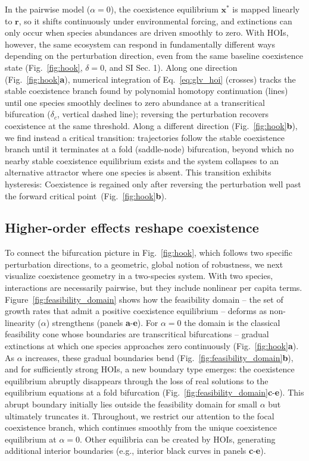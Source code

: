 \documentclass[
 reprint,
 amsmath,
 amssymb,
 aps,
 superscriptaddress,
]{revtex4-2}
\begin{document}
In the pairwise model (\(\alpha=0\)), the coexistence equilibrium \(\mathbf{x}^*\) is mapped linearly to \(\mathbf{r}\), so it shifts continuously under environmental forcing, and extinctions can only occur when species abundances are driven smoothly to zero. With HOIs, however, the same ecosystem can respond in fundamentally different ways depending on the perturbation direction, even from the same baseline coexistence state (Fig.~\ref{fig:hook}, $\delta=0$, and SI Sec. 1). Along one direction (Fig.~\ref{fig:hook}\textbf{a}), numerical integration of Eq.~\eqref{eq:glv_hoi} (crosses) tracks the stable coexistence branch found by polynomial homotopy continuation (lines) until one species smoothly declines to zero abundance at a transcritical bifurcation ($\delta_c$, vertical dashed line); reversing the perturbation recovers coexistence at the same threshold. Along a different direction (Fig.~\ref{fig:hook}\textbf{b}), we find instead a critical transition: trajectories follow the stable coexistence branch until it terminates at a fold (saddle-node) bifurcation, beyond which no nearby stable coexistence equilibrium exists and the system collapses to an alternative attractor where one species is absent. This transition exhibits hysteresis: Coexistence is regained only after reversing the perturbation well past the forward critical point~(Fig.~\ref{fig:hook}\textbf{b}).

\subsection*{Higher-order effects reshape coexistence}

To connect the bifurcation picture in Fig.~\ref{fig:hook}, which follows two specific perturbation directions, to a geometric, global notion of robustness, we next visualize coexistence geometry in a two-species system. With two species, interactions are necessarily pairwise, but they include nonlinear per capita terms. Figure~\ref{fig:feasibility_domain} shows how the feasibility domain -- the set of growth rates that admit a positive coexistence equilibrium -- deforms as non-linearity ($\alpha$) strengthens (panels \textbf{a}-\textbf{e}). For $\alpha=0$ the domain is the classical feasibility cone \cite{saavedra_structural_2017, song_guideline_2018, rohr_structural_2014} whose boundaries are transcritical bifurcations -- gradual extinctions at which one species approaches zero continuously (Fig.~\ref{fig:hook}\textbf{a}). As $\alpha$ increases, these gradual boundaries bend (Fig.~\ref{fig:feasibility_domain}\textbf{b}), and for sufficiently strong HOIs, a new boundary type emerges: the coexistence equilibrium abruptly disappears through the loss of real solutions to the equilibrium equations at a fold bifurcation (Fig.~\ref{fig:feasibility_domain}\textbf{c}-\textbf{e}). This abrupt boundary initially lies outside the feasibility domain for small $\alpha$ but ultimately truncates it. Throughout, we restrict our attention to the focal coexistence branch, which continues smoothly from the unique coexistence equilibrium at $\alpha=0$. Other equilibria can be created by HOIs, generating additional interior boundaries (e.g., interior black curves in panels \textbf{c}-\textbf{e}).
\end{document}
